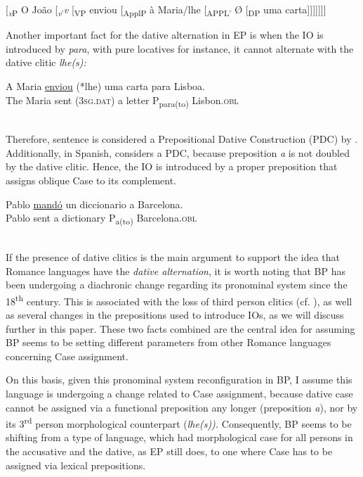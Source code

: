 \documentclass[output=paper,colorlinks,citecolor=brown]{./langscibook}
\begin{document}
\ea%
    \label{ex:calindro:7}
    [\textit{\textsubscript{v}}\textsubscript{P} O João [\textit{\textsubscript{v}}\textsubscript{’}\textit{v} [\textsubscript{VP} enviou [\textsubscript{ApplP} à Maria/lhe [\textsubscript{APPL’} Ø [\textsubscript{DP} uma carta]]]]]]] \hfill \citep[175]{TorresMorais2007}
    \z

Another important fact for the dative alternation in EP is when the IO is introduced by \textit{para}, with pure locatives for instance, it cannot alternate with the dative clitic \textit{lhe(s):}

\ea%
    \label{ex:calindro:8}
    \gll A Maria     \underline{enviou} (*lhe)      uma carta  {para} {Lisboa}.\\
    The Maria sent (\textsc{3sg.dat})  a letter      P{\textsubscript{para(to)}} Lisbon.\textsc{obl}\\
    \glt ~\hfill \citep[96]{TorresMorais2007}
    \z

Therefore, sentence  is considered a Prepositional Dative Construction (PDC) by \citet{TorresMorais2007}. Additionally, in Spanish, \citet{Cuervo2003} considers  a PDC, because preposition \textit{a} is not doubled by the dative clitic. Hence, the IO is introduced by a proper preposition that assigns oblique Case to its complement.

\ea%
    \label{ex:calindro:9}
    \gll Pablo \underline{mandó} un diccionario  {a} {Barcelona}.\\
    Pablo  sent      a dictionary     P\textsubscript{{a(to)}} Barcelona.\textsc{obl}\\
    \glt ~\hfill \citep[36]{Cuervo2003}
    \z

If the presence of dative clitics is the main argument to support the idea that Romance languages have the \textit{dative alternation}, it is worth noting that BP has been undergoing a diachronic change regarding its pronominal system since the 18\textsuperscript{th} century. This is associated with the loss of third person clitics (cf. \citealt{CarvalhoCalindro2018}), as well as several changes in the prepositions used to introduce IOs, as we will discuss further in this paper. These two facts combined are the central idea for assuming BP seems to be setting different parameters from other Romance languages concerning Case assignment.

On this basis, given this pronominal system reconfiguration in BP, I assume this language is undergoing a change related to Case assignment, because dative case cannot be assigned via a functional preposition any longer (preposition \textit{a}), nor by its 3\textsuperscript{rd} person morphological counterpart (\textit{lhe(s)).} Consequently, BP seems to be shifting from a type of language, which had morphological case for all persons in the accusative and the dative, as EP still does, to one where Case has to be assigned via lexical prepositions.
\end{document}
